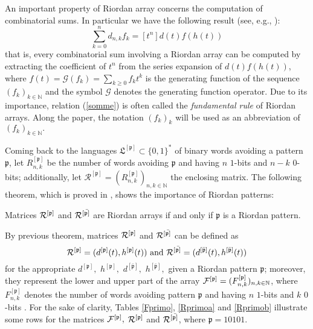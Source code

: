 An important property of Riordan array concerns the computation of
combinatorial sums.  In particular we have the following result (see, e.g.,
\cite{LMMS12,MSV09,Spr94}):
\begin{equation}
    \label{somme}
    \sum_{k=0}^n d_{n,k}f_k=[t^n]d(t)f(h(t))
\end{equation}
that is, every combinatorial sum involving a Riordan array can be computed by
extracting the coefficient of $t^n$ from the series expansion of $d(t)f(h(t))$,
where $f(t)=\mathcal{G}(f_k)=\sum_{k\geq 0}f_kt^k$ is the generating function of the
sequence $(f_k)_{k \in\mathbb{N}}$ and the symbol $\mathcal{G}$ denotes the generating function
operator. Due to its importance, relation (\ref{somme}) is often called the
\textit{fundamental rule} of Riordan arrays.  Along the paper, the notation
$(f_k)_{k}$ will be used as an abbreviation of $(f_k)_{k\in\mathbb{N}}.$

Coming back to the languages $\mathfrak{L}^{[\mathfrak{p}]}\subset \{0,1\}^*$
of binary words avoiding a pattern $\mathfrak{p}$, let
$R_{n,k}^{[\mathfrak{p}]}$ be the number of words avoiding $\mathfrak{p}$ and
having $n$ $1$-bits  and $n-k$  $0$-bits; additionally, let
$\mathcal{R}^{[\mathfrak{p}]}=\left(R_{n,k}^{[\mathfrak{p}]}\right)_{n,k\in\mathbb{N}}$
the enclosing matrix. The following theorem, which is proved in \cite{MS11},
shows the importance of Riordan patterns:
\begin{teo}
\label{main}
Matrices ${\cal{R}^{[\mathfrak{p}]}}$ and ${\cal{R}^{[\bar{\mathfrak{p}]}}}$
are Riordan arrays if and only if  $\mathfrak{p}$ is a Riordan pattern.
\end{teo}

By previous theorem, matrices ${\cal{R}^{[\mathfrak{p}]}}$ and
${\cal{R}^{[\bar{\mathfrak{p}]}}}$ can be defined as
$${\cal{R}^{[\mathfrak{p}]}}=(d^{[\mathfrak{p}]}(t),h^{[\mathfrak{p}]}(t)) \text{ and }
{\cal{R}^{[\bar{\mathfrak{p}]}}}=(d^{[\bar{\mathfrak{p}}]}(t),h^{[\bar{\mathfrak{p}}]}(t))$$
for the appropriate $d^{[\mathfrak{p}]},$ $h^{[\mathfrak{p}]},$ $d^{[\bar{\mathfrak{p}}]},$
$h^{[\bar{\mathfrak{p}}]},$ given a Riordan pattern $\mathfrak{p}$; moreover, they represent the lower and
upper part of the array
${\cal{F}^{[\mathfrak{p}]}}=(F_{n,k}^{[\mathfrak{p}]})_{n,k \in \mathbb{N}}$,
where $F_{n,k}^{[\mathfrak{p}]}$ denotes the number of words avoiding pattern
$\mathfrak{p}$ and having $n$ $1$-bits  and $k$ $0$-bits . For the sake of
clarity, Tables \ref{Fprimo}, \ref{Rprimoa} and \ref{Rprimob} illustrate some
rows for the matrices ${\cal{F}^{[\mathfrak{p}]}},$
${\cal{R}^{[\mathfrak{p}]}}$ and ${\cal{R}^{[\bar{\mathfrak{p}]}}}$, where
$\mathfrak{p}=10101$.

